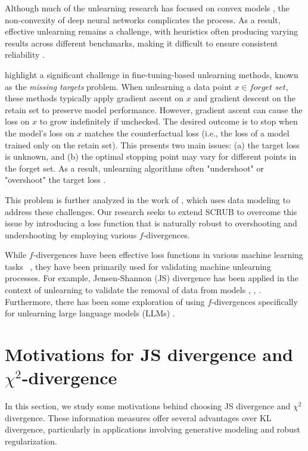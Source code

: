 \documentclass{article} %
\begin{document}
Although much of the unlearning research has focused on convex models \citep{sekhari2021rememberwantforgetalgorithms}, the non-convexity of deep neural networks complicates the process. As a result, effective unlearning remains a challenge, with heuristics often producing varying results across different benchmarks, making it difficult to ensure consistent reliability \citep{li2024machine}.

\citep{hayes2024} highlight a significant challenge in fine-tuning-based unlearning methods, known as the \textit{missing targets} problem. When unlearning a data point $x \in \textit{forget set}$, these methods typically apply gradient ascent on $x$ and gradient descent on the retain set to preserve model performance. However, gradient ascent can cause the loss on $x$ to grow indefinitely if unchecked. The desired outcome is to stop when the model's loss on $x$ matches the counterfactual loss (i.e., the loss of a model trained only on the retain set). This presents two main issues: (a) the target loss is unknown, and (b) the optimal stopping point may vary for different points in the forget set. As a result, unlearning algorithms often "undershoot" or "overshoot" the target loss \citep{hayes2024}.

This problem is further analyzed in the work of \citep{georgiev2024attributetodeletemachineunlearningdatamodel}, which uses data modeling to address these challenges. Our research seeks to extend SCRUB to overcome this issue by introducing a loss function that is naturally robust to overshooting and undershooting by employing various $f$-divergences.

While $f$-divergences have been effective loss functions in various machine learning tasks ~\citep{aminian2024robustsemisupervisedlearningfdivergence,roulet2025lossfunctionsoperatorsgenerated,novello2024fdivergencebasedclassificationuse,wang2023reverseklgeneralizingdirect}, they have been primarily used for validating machine unlearning processes. For example, Jensen-Shannon (JS) divergence has been applied in the context of unlearning to validate the removal of data from models \citep{bonato2025retain}, \citep{jeon2024information}, \citep{rangel2024learning}. Furthermore, there has been some exploration of using $f$-divergences specifically for unlearning large language models (LLMs) \citep{wang2024llm}.
\section{Motivations for JS divergence and \texorpdfstring{$\chi^2$}{chi-square}-divergence}
\label{appendix:A}
In this section, we study some motivations behind choosing JS divergence and $\chi^2$ divergence. These information measures offer several advantages over KL divergence, particularly in applications involving generative modeling and robust regularization.
\end{document}
